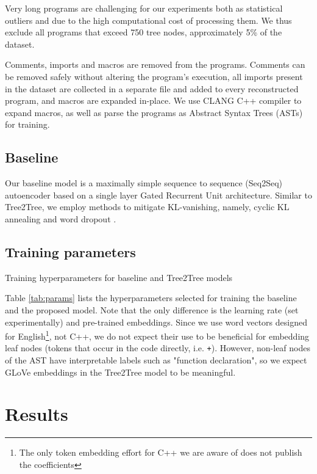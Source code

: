Very long programs are challenging for our experiments both as statistical outliers and due to the high computational cost of processing them. We thus exclude all programs that exceed 750 tree nodes, approximately 5\% of the dataset.

Comments, imports and macros are removed from the programs.
Comments can be removed safely without altering the program's execution, all imports present in the dataset are collected in a separate file and added to every reconstructed program, and macros are expanded in-place.
We use CLANG C++ compiler to expand macros, as well as parse the programs as Abstract Syntax Trees (ASTs) for training.

\subsection{Baseline}

Our baseline model is a maximally simple sequence to sequence (Seq2Seq) autoencoder based on a single layer Gated Recurrent Unit \cite{chung2014empirical} architecture. Similar to Tree2Tree, we employ methods to mitigate KL-vanishing, namely, cyclic KL annealing \cite{fu2019cyclical} and word dropout \cite{bowman2015generating}.

\subsection{Training parameters}

\begin{table}
\centering

\caption{Training hyperparameters for baseline and Tree2Tree models}
\label{tab:params}
\end{table}

Table \ref{tab:params} lists the hyperparameters selected for training the baseline and the proposed model.
Note that the only difference is the learning rate (set experimentally) and pre-trained embeddings.
Since we use word vectors designed for English\footnote{The only token embedding effort for C++ we are aware of \cite{harerAutomatedSoftwareVulnerability2018} does not publish the coefficients}, not C++, we do not expect their use to be beneficial for embedding leaf nodes (tokens that occur in the code directly, i.e. \verb|+|).
However, non-leaf nodes of the AST have interpretable labels such as "function declaration", so we expect GLoVe \cite{pennington2014glove} embeddings in the Tree2Tree model to be meaningful.

\newpage
\section{Results}
\label{sec:results}

